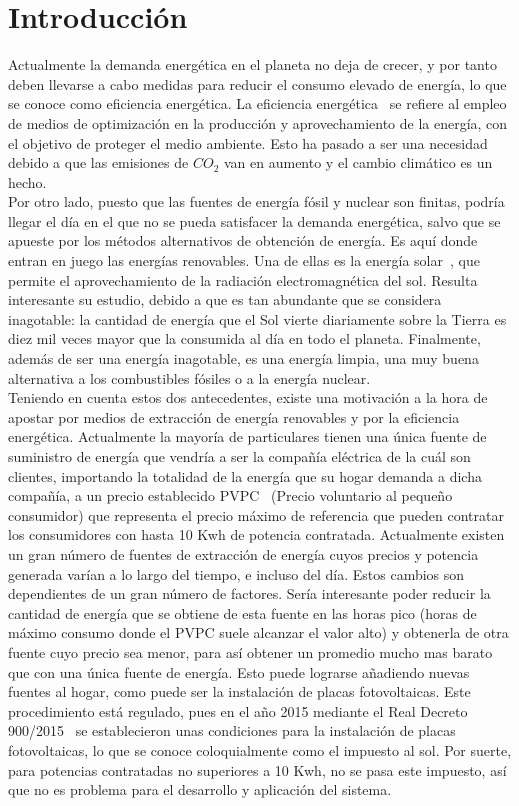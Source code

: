 \chapter{Introducción}
\label{cap:Introduccion}
Actualmente la demanda energética en el planeta no deja de crecer, y por tanto deben llevarse a cabo medidas para reducir el consumo elevado de energía, lo que se conoce como eficiencia energética. La eficiencia energética~\cite{GarSa12} se refiere al empleo de medios de optimización en la producción y aprovechamiento de la energía, con el objetivo de proteger el medio ambiente. Esto ha pasado a ser una necesidad debido a que las emisiones de $ CO_{2} $ van en aumento y el cambio climático es un hecho.\\

Por otro lado, puesto que las fuentes de energía fósil y nuclear son finitas, podría llegar el día en el que no se pueda satisfacer la demanda energética, salvo que se apueste por los métodos alternativos de obtención de energía. Es aquí donde entran en juego las energías renovables. Una de ellas es la energía solar~\cite{Perp12}, que permite el aprovechamiento de la radiación electromagnética del sol. Resulta interesante su estudio, debido a que es tan abundante que se considera inagotable: la cantidad de energía que el Sol vierte diariamente sobre la Tierra es diez mil veces mayor que la consumida al día en todo el planeta. Finalmente, además de ser una energía inagotable, es una energía limpia, una muy buena alternativa a los combustibles fósiles o a la energía nuclear. \\

Teniendo en cuenta estos dos antecedentes, existe una motivación a la hora de apostar por medios de extracción de energía renovables y por la eficiencia energética. Actualmente la mayoría de particulares tienen una única fuente de suministro de energía que vendría a ser la compañía eléctrica de la cuál son clientes, importando la totalidad de la energía que su hogar demanda a dicha compañía, a un precio establecido \gls{PVPC}~\cite{Ree14} (Precio voluntario al pequeño consumidor) que representa el precio máximo de referencia que pueden contratar los consumidores con hasta 10 Kwh de potencia contratada. Actualmente existen un gran número de fuentes de extracción de energía cuyos precios y potencia generada varían a lo largo del tiempo, e incluso del día. Estos cambios son dependientes de un gran número de factores. Sería interesante poder reducir la cantidad de energía que se obtiene de esta fuente en las horas pico (horas de máximo consumo donde el \gls{PVPC} suele alcanzar el valor alto) y obtenerla de otra fuente cuyo precio sea menor, para así obtener un promedio mucho mas barato que con una única fuente de energía. Esto puede lograrse añadiendo nuevas fuentes al hogar, como puede ser la instalación de placas fotovoltaicas. Este procedimiento está regulado, pues en el año 2015 mediante el Real Decreto 900/2015~\cite{Boe15} se establecieron unas condiciones para la instalación de placas fotovoltaicas, lo que se conoce coloquialmente como el impuesto al sol. Por suerte, para potencias contratadas no superiores a 10 Kwh, no se pasa este impuesto, así que no es problema para el desarrollo y aplicación del sistema.\\

